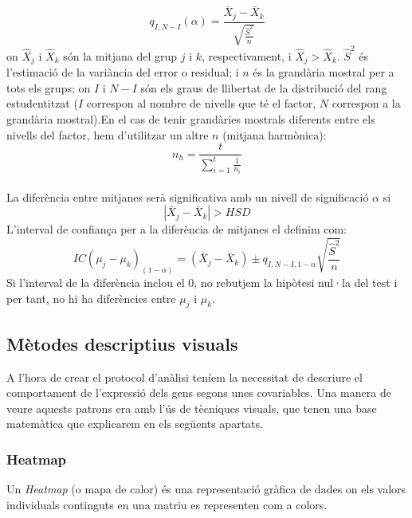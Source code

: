 \documentclass[english]{article}
\begin{document}
\begin{equation*}
q_{I,N-I}(\alpha) = \frac{\bar{X}_j - \bar{X}_k}{\sqrt{\frac{\hat{S}^2}{n}}}
\end{equation*}
on $\hat{X}_j$ i $\hat{X}_k$ són la mitjana del grup $j$ i $k$, respectivament, i $\hat{X}_j > \hat{X}_k$. $\hat{S}^2$ és l'estimació de la variància del error o residual; i $n$ és la grandària mostral per a tots els grups; on $I$ i $N-I$ són els graus de llibertat de la distribució del rang estudentitzat ($I$ correspon al nombre de nivells que té el factor, $N$ correspon a la grandària mostral).En el cas de tenir grandàries mostrals diferents entre els nivells del factor, hem d'utilitzar un altre $n$ (mitjana harmònica):
\begin{equation*}
n_h = \frac{t}{\sum_{i=1}^{t}\frac{1}{n_i}}
\end{equation*}
\\

La diferència entre mitjanes serà significativa amb un nivell de significació $\alpha$ si
\begin{equation*}
|\bar{X}_j - \bar{X}_k |> HSD
\end{equation*}
L'interval de confian\c{c}a per a la diferència de mitjanes el definim com:
\begin{equation*}
IC(\mu_j - \mu_k)_{(1-\alpha)}= (\bar{X}_j - \bar{X}_k) \pm q_{I,N-I,1-\alpha}\sqrt{\frac{\hat{S}^2}{n}}
\end{equation*}
Si l'interval de la diferència inclou el 0, no rebutjem la hipòtesi nul·la del test i per tant, no hi ha diferències entre $\mu_j$ i $\mu_k$.
\subsection{Mètodes descriptius visuals}
A l'hora de crear el protocol d'anàlisi teníem la necessitat de descriure el comportament de l'expressió dels gens segons unes covariables. Una manera de veure aquests patrons era amb l'ús de tècniques visuals, que tenen una base matemàtica que explicarem en els següents apartats.
\subsubsection{Heatmap}
Un \textit{Heatmap} (o mapa de calor) és una representació gràfica de dades on els valors individuals continguts en una matriu es representen com a colors.
\\
\end{document}
